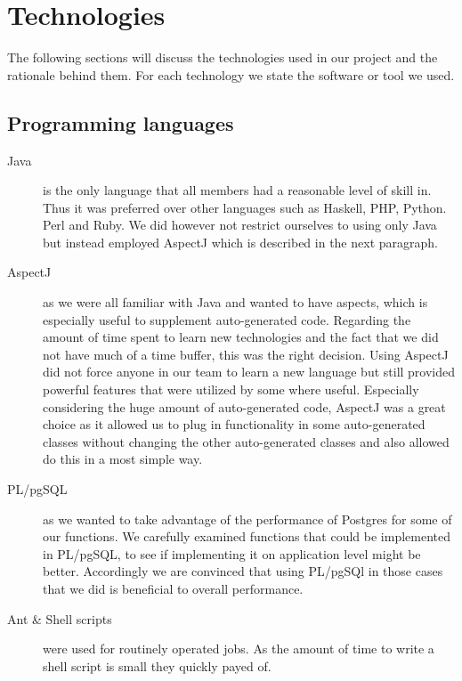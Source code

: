 \section{Technologies}
The following sections will discuss the technologies used in our project and the rationale behind them. For each technology we state the software or tool we used.

\subsection{Programming languages}
\begin{description}

\item[Java] is the only language that all members had a reasonable level of skill in. Thus it was preferred over other languages such as Haskell, PHP, Python. Perl and Ruby. We did however not restrict ourselves to using only Java but instead employed AspectJ which is described in the next paragraph.

\item[AspectJ] as we were all familiar with Java and wanted to have aspects, which is especially useful to supplement auto-generated code. Regarding the amount of time spent to learn new technologies and the fact that we did not have much of a time buffer,  this was the right decision. Using AspectJ did not force anyone in our team to learn a new language but still provided powerful features that were utilized by some where useful. Especially considering the huge amount of auto-generated code, AspectJ was a great choice as it allowed us to plug in functionality in some auto-generated classes without changing the other auto-generated classes and also allowed do this in a most simple way.

\item[PL/pgSQL] as we wanted to take advantage of the performance of Postgres for some of our functions. We carefully examined functions that could be implemented in PL/pgSQL, to see if implementing it on application level might be better. Accordingly we are convinced that using PL/pgSQl in those cases that we did is beneficial to overall performance.

\item[Ant \& Shell scripts] were used for routinely operated jobs. As the amount of time to write a shell script is small they quickly payed of. 
\end{description}

